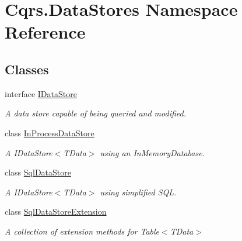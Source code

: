 \hypertarget{namespaceCqrs_1_1DataStores}{}\section{Cqrs.\+Data\+Stores Namespace Reference}
\label{namespaceCqrs_1_1DataStores}
\subsection*{Classes}
\begin{DoxyCompactItemize}
\item 
interface \hyperlink{interfaceCqrs_1_1DataStores_1_1IDataStore}{I\+Data\+Store}
\begin{DoxyCompactList}\small\item\em A data store capable of being queried and modified. \end{DoxyCompactList}\item 
class \hyperlink{classCqrs_1_1DataStores_1_1InProcessDataStore}{In\+Process\+Data\+Store}
\begin{DoxyCompactList}\small\item\em A I\+Data\+Store$<$\+T\+Data$>$ using an In\+Memory\+Database. \end{DoxyCompactList}\item 
class \hyperlink{classCqrs_1_1DataStores_1_1SqlDataStore}{Sql\+Data\+Store}
\begin{DoxyCompactList}\small\item\em A I\+Data\+Store$<$\+T\+Data$>$ using simplified S\+QL. \end{DoxyCompactList}\item 
class \hyperlink{classCqrs_1_1DataStores_1_1SqlDataStoreExtension}{Sql\+Data\+Store\+Extension}
\begin{DoxyCompactList}\small\item\em A collection of extension methods for Table$<$\+T\+Data$>$ \end{DoxyCompactList}\end{DoxyCompactItemize}
